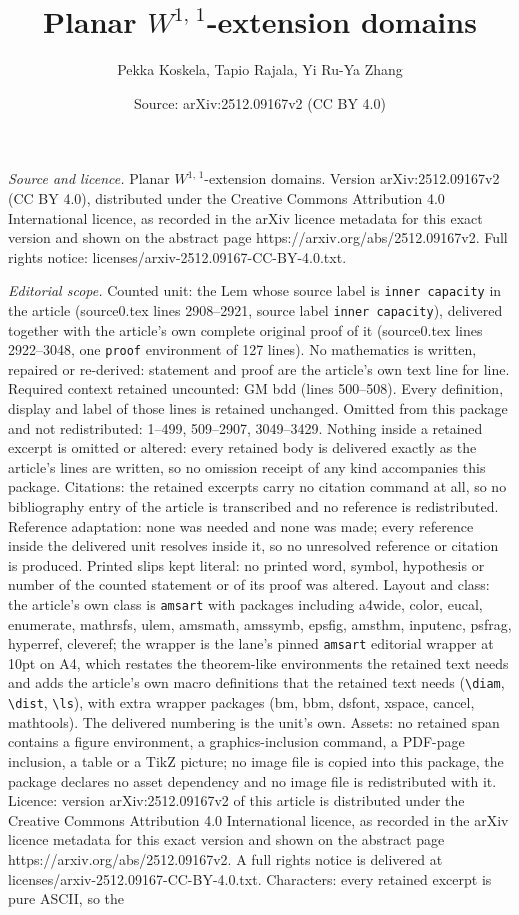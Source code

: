 \documentclass[10pt,a4paper]{amsart}
\title[Planar $W^{1,\,1}$-extension domains]{Planar $W^{1,\,1}$-extension domains}
\author{Pekka Koskela, Tapio Rajala, Yi Ru-Ya Zhang}
\date{Source: arXiv:2512.09167v2 (CC BY 4.0)}
\begin{document}
\maketitle

\noindent\emph{Source and licence.} Planar $W^{1,\,1}$-extension domains. Version arXiv:2512.09167v2 (CC BY 4.0), distributed under the Creative Commons Attribution 4.0 International licence, as recorded in the arXiv licence metadata for this exact version and shown on the abstract page https://arxiv.org/abs/2512.09167v2. Full rights notice: licenses/arxiv-2512.09167-CC-BY-4.0.txt.\par\smallskip

\noindent\textit{Editorial scope.} Counted unit: the Lem whose source label is \texttt{inner capacity} in the article (source0.tex lines 2908--2921, source label \texttt{inner capacity}), delivered together with the article's own complete original proof of it (source0.tex lines 2922--3048, one \texttt{proof} environment of 127 lines). No mathematics is written, repaired or re-derived: statement and proof are the article's own text line for line. Required context retained uncounted: GM bdd (lines 500--508). Every definition, display and label of those lines is retained unchanged. Omitted from this package and not redistributed: 1--499, 509--2907, 3049--3429. Nothing inside a retained excerpt is omitted or altered: every retained body is delivered exactly as the article's lines are written, so no omission receipt of any kind accompanies this package. Citations: the retained excerpts carry no citation command at all, so no bibliography entry of the article is transcribed and no reference is redistributed. Reference adaptation: none was needed and none was made; every reference inside the delivered unit resolves inside it, so no unresolved reference or citation is produced. Printed slips kept literal: no printed word, symbol, hypothesis or number of the counted statement or of its proof was altered. Layout and class: the article's own class is \texttt{amsart} with packages including a4wide, color, eucal, enumerate, mathrsfs, ulem, amsmath, amssymb, epsfig, amsthm, inputenc, psfrag, hyperref, cleveref; the wrapper is the lane's pinned \texttt{amsart} editorial wrapper at 10pt on A4, which restates the theorem-like environments the retained text needs and adds the article's own macro definitions that the retained text needs (\texttt{\textbackslash diam}, \texttt{\textbackslash dist}, \texttt{\textbackslash ls}), with extra wrapper packages (bm, bbm, dsfont, xspace, cancel, mathtools). The delivered numbering is the unit's own. Assets: no retained span contains a figure environment, a graphics-inclusion command, a PDF-page inclusion, a table or a TikZ picture; no image file is copied into this package, the package declares no asset dependency and no image file is redistributed with it. Licence: version arXiv:2512.09167v2 of this article is distributed under the Creative Commons Attribution 4.0 International licence, as recorded in the arXiv licence metadata for this exact version and shown on the abstract page https://arxiv.org/abs/2512.09167v2. A full rights notice is delivered at licenses/arxiv-2512.09167-CC-BY-4.0.txt. Characters: every retained excerpt is pure ASCII, so the 
\end{document}
